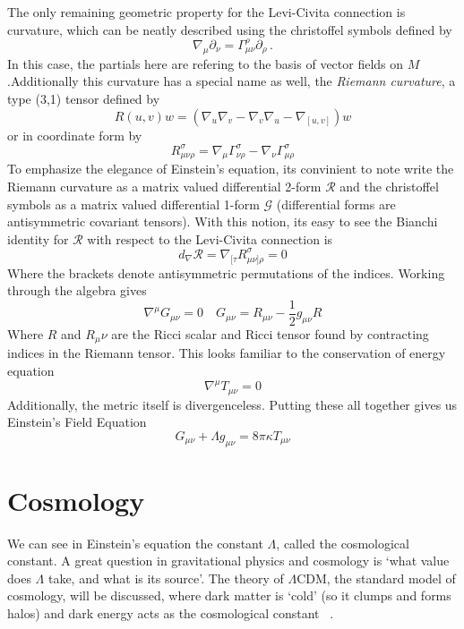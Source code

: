 The only remaining geometric property for the Levi-Civita connection is curvature, which can be neatly described using the christoffel symbols defined by
\begin{equation}
    \nabla_\mu\partial_\nu = \Gamma^{\rho}_{\mu\nu}\partial_\rho\,.
\end{equation}
In this case, the partials here are refering to the basis of vector fields on $M$.Additionally this curvature has a special name as well, the \textit{Riemann curvature}, a type (3,1) tensor defined by
\begin{equation}
    R(u,v)w = (\nabla_u\nabla_v-\nabla_v\nabla_u - \nabla_{[u,v]})w
\end{equation}
or in coordinate form by
\begin{equation}
    R_{\mu\nu\rho}^\sigma  = \nabla_\mu \Gamma^\sigma_{\nu\rho} - \nabla_\nu\Gamma^{\sigma}_{\mu\rho}
\end{equation}
To emphasize the elegance of Einstein's equation, its convinient to note write the Riemann curvature as a matrix valued differential 2-form $\mathcal{R}$ and the christoffel symbols as a matrix valued differential 1-form $\mathcal{G}$ (differential forms are antisymmetric covariant tensors). With this notion, its easy to see the Bianchi identity for $\mathcal{R}$ with respect to the Levi-Civita connection is
\begin{equation}
    d_{\nabla}\mathcal{R} = \nabla_{[\tau}R^\sigma_{\mu\nu]\rho} = 0
\end{equation}
Where the brackets denote antisymmetric permutations of the indices. Working through the algebra gives
\begin{equation}
    \nabla^\mu G_{\mu\nu} = 0\quad G_{\mu\nu} = R_{\mu\nu}-\frac{1}{2}g_{\mu\nu}R
\end{equation}
Where $R$ and $R_\mu\nu$ are the Ricci scalar and Ricci tensor found by contracting indices in the Riemann tensor. This looks familiar to the conservation of energy equation
\begin{equation}
    \nabla^\mu T_{\mu\nu}=0
\end{equation}
Additionally, the metric itself is divergenceless. Putting these all together gives us Einstein's Field Equation
\begin{equation}
    G_{\mu\nu} + \Lambda g_{\mu\nu} = 8\pi\kappa T_{\mu\nu}
\end{equation}

\section{Cosmology}
We can see in Einstein's equation the constant $\Lambda$, called the cosmological constant. A great question in gravitational physics and cosmology is `what value does $\Lambda$ take, and what is its source'. The theory of $\Lambda$CDM, the standard model of cosmology, will be discussed, where dark matter is `cold' (so it clumps and forms halos) and dark energy acts as the cosmological constant ~\cite{scott_dodelson_modern_2021}.

